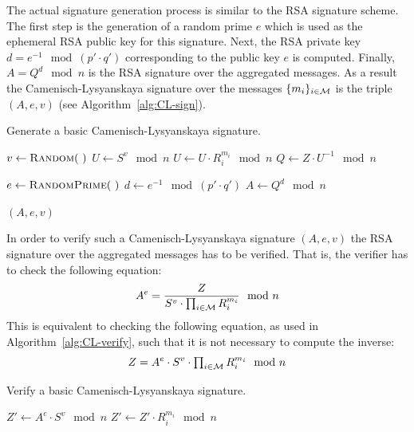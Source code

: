 The actual signature generation process is similar to the RSA signature scheme.
The first step is the generation of a random prime $e$ which is used as the
ephemeral RSA public key for this signature. Next, the RSA private key
$d = e^{-1} \mod (p' \cdot q')$ corresponding to the public key $e$ is
computed. Finally, $A = Q^d \mod n$ is the RSA signature over the aggregated
messages. As a result the Camenisch-Lysyanskaya signature over the messages
$\{m_i\}_{i \in \mathcal{M}}$ is the triple $(A, e, v)$ (see
Algorithm~\ref{alg:CL-sign}).

\clearpage

\begin{algorithm}
  \caption{Generate a basic Camenisch-Lysyanskaya signature.}
  \label{alg:CL-sign}
  \addtolength{\baselineskip}{1mm}
  \begin{algorithmic}[1]
      \State $v \gets \Call{Random}{~}$
      \State $U \gets S^v \mod n$
        \State $U \gets U \cdot R_i^{m_i} \mod n$
      \EndFor
      \State $Q \gets Z \cdot U^{-1} \mod n$

      \State $e \gets \Call{RandomPrime}{~}$
      \State $d \gets e^{-1} \mod (p' \cdot q')$
      \State $A \gets Q^d \mod n$

      \Return $(A, e, v)$
    \EndFunction
  \end{algorithmic}
\end{algorithm}

In order to verify such a Camenisch-Lysyanskaya signature $(A, e, v)$ the RSA
signature over the aggregated messages has to be verified. That is, the verifier
has to check the following equation:
\begin{equation}\label{eqn:CL-verify}
  A^e = \dfrac{Z}{S^v \cdot \prod_{i \in \mathcal{M}} R_i^{m_i}} \mod n
\end{equation}
This is equivalent to checking the following equation, as used in
Algorithm~\ref{alg:CL-verify}, such that it is not necessary to compute the
inverse:
\begin{equation}\label{eqn:CL-verify-Z}
  Z = A^e \cdot S^v \cdot \textstyle\prod_{i \in \mathcal{M}} R_i^{m_i} \mod n
\end{equation}

\begin{algorithm}
  \caption{Verify a basic Camenisch-Lysyanskaya signature.}
  \label{alg:CL-verify}
  \addtolength{\baselineskip}{1mm}
  \begin{algorithmic}[1]
      \State $Z' \gets A^e \cdot S^v \mod n$
        \State $Z' \gets Z' \cdot R_i^{m_i} \mod n$
      \EndFor

        \Return {}
      \EndIf

      \Return {}
    \EndFunction
  \end{algorithmic}
\end{algorithm}


